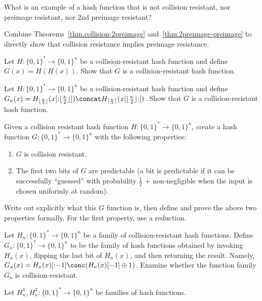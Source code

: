 \begin{problems}
  \item What is an example of a hash function that is not collision resistant, nor preimage resistant, nor
        2nd preimage resistant?
  \item Combine Theorems~\ref{thm.collision-2preimage} and~\ref{thm.2preimage-preimage} to
        directly show that collision resistance implies preimage resistance.
  \item Let $H:\{0,1\}^* \to \{0,1\}^{\kappa}$ be a collision-resistant hash
        function and define $G(x) = H(H(x))$. Show that $G$ is a
        collision-resistant hash function.
  \item Let $H:\{0,1\}^* \to \{0,1\}^{\kappa}$ be a collision-resistant hash
        function and define $G_\kappa(x) = H_{\lfloor\frac{\kappa}{2}\rfloor}(x[{:}{\lfloor\frac{\kappa}{2}\rfloor}]) \concat H_{\lceil\frac{\kappa}{2}\rceil}(x[{\lfloor\frac{\kappa}{2}\rfloor}{:}])$. Show that $G$ is a
        collision-resistant hash function.
  \item Given a collision resistant hash function
        $H: \{0, 1\}^* \longrightarrow \{0, 1\}^\kappa$, create a hash function
        $G: \{0, 1\}^* \longrightarrow \{0, 1\}^\kappa$ with the following
        properties:
        \begin{enumerate}
          \item $G$ is collision resistant.
          \item The first two bits of $G$ are predictable (a bit is predictable
                if it can be successfully ``guessed'' with probability
                $\frac{1}{2}$ + non-negligible when the input is chosen
                uniformly at random).
        \end{enumerate}
        Write out explicitly what this $G$ function is, then define and prove
        the above two properties formally. For the first property, use a
        reduction.
  \item Let $H_\kappa: \{0, 1\}^* \longrightarrow \{0, 1\}^\kappa$ be a family of
        collision-resistant hash functions. Define $G_\kappa: \{0, 1\}^* \longrightarrow
        \{0, 1\}^\kappa$ to be the family of hash functions obtained by invoking
        $H_\kappa(x)$, flipping the last bit of $H_\kappa(x)$, and then returning the
        result. Namely, $G_\kappa(x) = H_\kappa(x)[{:}{-1}] \conc (H_\kappa(x)[-1]
        \oplus 1)$. Examine whether the function family $G_\kappa$ is collision-resistant.
  \item Let $H_\kappa^1, H_\kappa^2: \{0, 1\}^* \longrightarrow \{0, 1\}^\kappa$ be families of hash functions. 

\end{problems}
